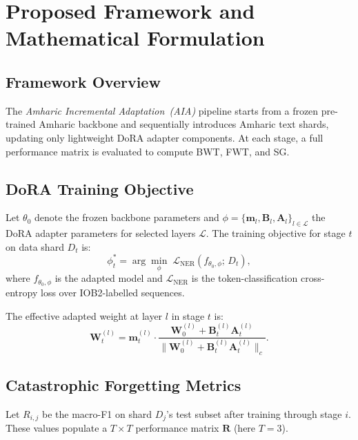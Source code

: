 \documentclass[11pt,a4paper]{article}
\begin{document}
\section{Proposed Framework and Mathematical Formulation}
\label{sec:framework}

\subsection{Framework Overview}

The \emph{Amharic Incremental Adaptation~(AIA)} pipeline starts from a
frozen pre-trained Amharic backbone and sequentially introduces
Amharic text shards, updating only lightweight DoRA adapter components.
At each stage, a full performance matrix is evaluated to compute BWT,
FWT, and SG.

\subsection{DoRA Training Objective}

Let $\theta_0$ denote the frozen backbone parameters and
$\phi = \{\mathbf{m}_l, \mathbf{B}_l, \mathbf{A}_l\}_{l \in \mathcal{L}}$
the DoRA adapter parameters for selected layers $\mathcal{L}$.
The training objective for stage $t$ on data shard $D_t$ is:
\begin{equation}
  \phi^*_t = \arg\min_\phi \;
    \mathcal{L}_{\text{NER}}\!\left(f_{\theta_0,\phi};\, D_t\right),
  \label{eq:doraObj}
\end{equation}
where $f_{\theta_0,\phi}$ is the adapted model and
$\mathcal{L}_{\text{NER}}$ is the token-classification cross-entropy
loss over IOB2-labelled sequences.

The effective adapted weight at layer $l$ in stage $t$ is:
\begin{equation}
  \mathbf{W}^{(l)}_t =
    \mathbf{m}^{(l)}_t \cdot
    \frac{\mathbf{W}^{(l)}_0 + \mathbf{B}^{(l)}_t \mathbf{A}^{(l)}_t}
         {\bigl\|\mathbf{W}^{(l)}_0 + \mathbf{B}^{(l)}_t \mathbf{A}^{(l)}_t\bigr\|_c}.
  \label{eq:doraLayer}
\end{equation}

\subsection{Catastrophic Forgetting Metrics}

Let $R_{i,j}$ be the macro-F1 on shard $D_j$'s test subset after
training through stage $i$.  These values populate a $T \times T$
performance matrix $\mathbf{R}$ (here $T = 3$).
\end{document}
